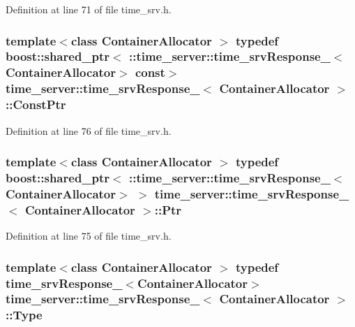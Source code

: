 \-Definition at line 71 of file time\-\_\-srv.\-h.

\subsubsection[{\-Const\-Ptr}]{\setlength{\rightskip}{0pt plus 5cm}template$<$class Container\-Allocator $>$ typedef boost\-::shared\-\_\-ptr$<$ \-::{\bf time\-\_\-server\-::time\-\_\-srv\-Response\-\_\-}$<$\-Container\-Allocator$>$ const$>$ {\bf time\-\_\-server\-::time\-\_\-srv\-Response\-\_\-}$<$ \-Container\-Allocator $>$\-::{\bf \-Const\-Ptr}}\label{structtime__server_1_1time__srvResponse___a072dc748f43eff5d86ff0c76d7a06ff1}


\-Definition at line 76 of file time\-\_\-srv.\-h.

\subsubsection[{\-Ptr}]{\setlength{\rightskip}{0pt plus 5cm}template$<$class Container\-Allocator $>$ typedef boost\-::shared\-\_\-ptr$<$ \-::{\bf time\-\_\-server\-::time\-\_\-srv\-Response\-\_\-}$<$\-Container\-Allocator$>$ $>$ {\bf time\-\_\-server\-::time\-\_\-srv\-Response\-\_\-}$<$ \-Container\-Allocator $>$\-::{\bf \-Ptr}}\label{structtime__server_1_1time__srvResponse___a18cccade8b14bf79444417fec3116702}


\-Definition at line 75 of file time\-\_\-srv.\-h.

\subsubsection[{\-Type}]{\setlength{\rightskip}{0pt plus 5cm}template$<$class Container\-Allocator $>$ typedef {\bf time\-\_\-srv\-Response\-\_\-}$<$\-Container\-Allocator$>$ {\bf time\-\_\-server\-::time\-\_\-srv\-Response\-\_\-}$<$ \-Container\-Allocator $>$\-::{\bf \-Type}}\label{structtime__server_1_1time__srvResponse___aa1b5dce9a5fe012f926eb56e9f4c5db8}


